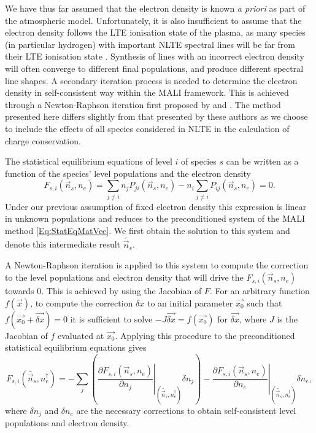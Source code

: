 We have thus far assumed that the electron density is known \emph{a priori} as part of the atmospheric model.
Unfortunately, it is also insufficient to assume that the electron density follows the LTE ionisation state of the plasma, as many species (in particular hydrogen) with important NLTE spectral lines will be far from their LTE ionisation state \citep[e.g.][]{Heinzel1995,Paletou1995,Bjorgen2019}.
Synthesis of lines with an incorrect electron density will often converge to different final populations, and produce different spectral line shapes.
A secondary iteration process is needed to determine the electron density in self-consistent way within the MALI framework.
This is achieved through a Newton-Raphson iteration first proposed by \citet{Heinzel1995} and \citet{Paletou1995}.
The method presented here differs slightly from that presented by these authors as we choose to include the effects of all species considered in NLTE in the calculation of charge conservation.

The statistical equilibrium equations of level $i$ of species $s$ can be written as a function of the species' level populations and the electron density
\begin{equation}
    \label{Eq:EseFn}
    F_{s, i}(\vec{n}_s, n_e) = \sum_{j\neq i} n_j P_{ji}(\vec{n}_s, n_e) - n_i\sum_{j\neq i} P_{ij}(\vec{n}_s, n_e) = 0.
\end{equation}
Under our previous assumption of fixed electron density this expression is linear in unknown populations and reduces to the preconditioned system of the MALI method \eqref{Eq:StatEqMatVec}.
We first obtain the solution to this system and denote this intermediate result $\widetilde{\vec{n}_s}$.

A Newton-Raphson iteration is applied to this system to compute the correction to the level populations and electron density that will drive the $F_{s,i}(\vec{n}_s, n_e)$ towards 0.
This is achieved by using the Jacobian of $F$.
For an arbitrary function $f(\vec{x})$, to compute the correction $\delta x$ to an initial parameter $\vec{x_0}$ such that $f(\vec{x_0} + \vec{\delta x}) = 0$ it is sufficient to solve $-J\vec{\delta x} = f(\vec{x_0})$ for $\vec{\delta x}$, where $J$ is the Jacobian of $f$ evaluated at $\vec{x_0}$.
Applying this procedure to the preconditioned statistical equilibrium equations gives
\begin{equation}
    \label{Eq:LinNr}
    F_{s, i}(\widetilde{\vec{n}_s}, n_e^\dagger) =
    - \sum_j \left( \left.\frac{\partial F_{s,i}(\vec{n}_s, n_e)}{\partial n_j}\right\rvert_{(\widetilde{\vec{n}_s}, n_e^\dagger)} \delta n_j \right)
    - \left.\frac{\partial F_{s,i}(\vec{n}_s, n_e)}{\partial n_e}\right\rvert_{(\widetilde{\vec{n}_s}, n_e^\dagger)} \delta n_e,
\end{equation}
where $\delta n_j$ and $\delta n_e$ are the necessary corrections to obtain self-consistent level populations and electron density.

